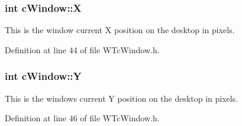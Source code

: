 \hypertarget{classc_window_a0d94ec5d7fc9eca768ae27437a676ef6}{
\subsubsection[{X}]{\setlength{\rightskip}{0pt plus 5cm}int {\bf cWindow::X}}}
\label{classc_window_a0d94ec5d7fc9eca768ae27437a676ef6}


This is the window current X position on the desktop in pixels. 



Definition at line 44 of file WTcWindow.h.

\hypertarget{classc_window_ab14f20c05d88b8e620a3a0a7aa85d331}{
\subsubsection[{Y}]{\setlength{\rightskip}{0pt plus 5cm}int {\bf cWindow::Y}}}
\label{classc_window_ab14f20c05d88b8e620a3a0a7aa85d331}


This is the windows current Y position on the desktop in pixels. 



Definition at line 46 of file WTcWindow.h.

